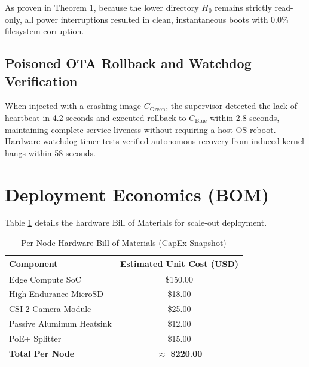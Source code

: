 \documentclass[conference]{IEEEtran}
\begin{document}
As proven in Theorem 1, because the lower directory $H_0$ remains strictly read-only, all power interruptions resulted in clean, instantaneous boots with 0.0\% filesystem corruption.

\subsection{Poisoned OTA Rollback and Watchdog Verification}
When injected with a crashing image $C_{\mathrm{Green}}$, the supervisor detected the lack of heartbeat in 4.2 seconds and executed rollback to $C_{\mathrm{Blue}}$ within 2.8 seconds, maintaining complete service liveness without requiring a host OS reboot. Hardware watchdog timer tests verified autonomous recovery from induced kernel hangs within 58 seconds.

\section{Deployment Economics (BOM)}

Table \ref{tab:bom} details the hardware Bill of Materials for scale-out deployment.

\begin{table}[htbp]
\caption{Per-Node Hardware Bill of Materials (CapEx Snapshot)}
\begin{center}
\begin{tabular}{lc}
\toprule
\textbf{Component} & \textbf{Estimated Unit Cost (USD)} \\
\midrule
Edge Compute SoC & \$150.00 \\
High-Endurance MicroSD & \$18.00 \\
CSI-2 Camera Module & \$25.00 \\
Passive Aluminum Heatsink & \$12.00 \\
PoE+ Splitter & \$15.00 \\
\midrule
\textbf{Total Per Node} & \textbf{$\approx$ \$220.00} \\
\bottomrule
\end{tabular}
\end{center}
\label{tab:bom}
\end{table}
\end{document}
